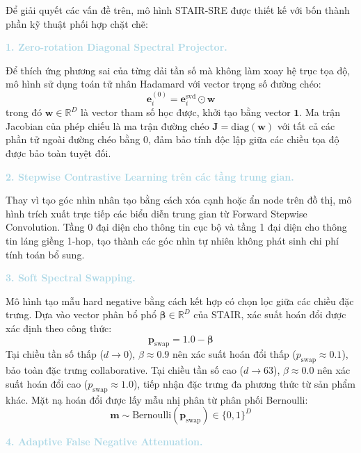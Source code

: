 Để giải quyết các vấn đề trên, mô hình STAIR-SRE được thiết kế với bốn thành phần kỹ thuật phối hợp chặt chẽ:

\noindent\textcolor{lightblue}{\textbf{1. Zero-rotation Diagonal Spectral Projector.}}

Để thích ứng phương sai của từng dải tần số mà không làm xoay hệ trục tọa độ, mô hình sử dụng toán tử nhân Hadamard với vector trọng số đường chéo:
\begin{equation}
\mathbf{e}_i^{(0)} = \mathbf{e}_{i}^{\text{svd}} \odot \mathbf{w}
\end{equation}
trong đó $\mathbf{w} \in \mathbb{R}^D$ là vector tham số học được, khởi tạo bằng vector $\mathbf{1}$. Ma trận Jacobian của phép chiếu là ma trận đường chéo $\mathbf{J} = \text{diag}(\mathbf{w})$ với tất cả các phần tử ngoài đường chéo bằng 0, đảm bảo tính độc lập giữa các chiều tọa độ được bảo toàn tuyệt đối.

\noindent\textcolor{lightblue}{\textbf{2. Stepwise Contrastive Learning trên các tầng trung gian.}}

Thay vì tạo góc nhìn nhân tạo bằng cách xóa cạnh hoặc ẩn node trên đồ thị, mô hình trích xuất trực tiếp các biểu diễn trung gian từ Forward Stepwise Convolution. Tầng 0 đại diện cho thông tin cục bộ và tầng 1 đại diện cho thông tin láng giềng 1-hop, tạo thành các góc nhìn tự nhiên không phát sinh chi phí tính toán bổ sung.

\noindent\textcolor{lightblue}{\textbf{3. Soft Spectral Swapping.}}

Mô hình tạo mẫu hard negative bằng cách kết hợp có chọn lọc giữa các chiều đặc trưng. Dựa vào vector phân bổ phổ $\boldsymbol{\beta} \in \mathbb{R}^D$ của STAIR, xác suất hoán đổi được xác định theo công thức:
\begin{equation}
\mathbf{p}_{\text{swap}} = 1.0 - \boldsymbol{\beta}
\end{equation}
Tại chiều tần số thấp ($d \to 0$), $\beta \approx 0.9$ nên xác suất hoán đổi thấp ($p_{\text{swap}} \approx 0.1$), bảo toàn đặc trưng collaborative. Tại chiều tần số cao ($d \to 63$), $\beta \approx 0.0$ nên xác suất hoán đổi cao ($p_{\text{swap}} \approx 1.0$), tiếp nhận đặc trưng đa phương thức từ sản phẩm khác. Mặt nạ hoán đổi được lấy mẫu nhị phân từ phân phối Bernoulli:
\begin{equation}
\mathbf{m} \sim \text{Bernoulli}(\mathbf{p}_{\text{swap}}) \in \{0, 1\}^D
\end{equation}

\noindent\textcolor{lightblue}{\textbf{4. Adaptive False Negative Attenuation.}}

